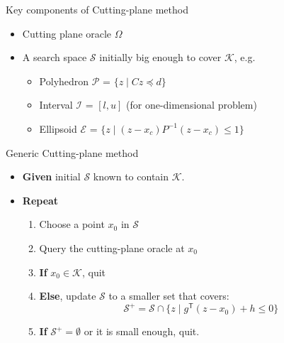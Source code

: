 \documentclass[10pt,ignorenonframetext,serif,onlymath]{beamer}
\providecommand{\tightlist}{%
  \setlength{\itemsep}{0pt}\setlength{\parskip}{0pt}}
\begin{document}
\begin{frame}{Key components of Cutting-plane method}
\protect\hypertarget{sec:key-components-of-cutting-plane-method}{}

\begin{itemize}
\tightlist
\item
  Cutting plane oracle \(\Omega\)
\item
  A search space \(\mathcal{S}\) initially big enough to cover
  \(\mathcal{K}\), e.g.

  \begin{itemize}
  \tightlist
  \item
    Polyhedron \(\mathcal{P}\) = \(\{z \mid C z \preceq d \}\)
  \item
    Interval \(\mathcal{I}\) = \([l, u]\) (for one-dimensional problem)
  \item
    Ellipsoid \(\mathcal{E}\) =
    \(\{z \mid (z-x_c)P^{-1}(z-x_c) \leq 1 \}\)
  \end{itemize}
\end{itemize}

\end{frame}

\begin{frame}{Generic Cutting-plane method}
\protect\hypertarget{sec:generic-cutting-plane-method}{}

\begin{itemize}
\tightlist
\item
  \textbf{Given} initial \(\mathcal{S}\) known to contain
  \(\mathcal{K}\).
\item
  \textbf{Repeat}

  \begin{enumerate}
  [1.]
  \tightlist
  \item
    Choose a point \(x_0\) in \(\mathcal{S}\)
  \item
    Query the cutting-plane oracle at \(x_0\)
  \item
    \textbf{If} \(x_0 \in \mathcal{K}\), quit
  \item
    \textbf{Else}, update \(\mathcal{S}\) to a smaller set that covers:
    \[\mathcal{S}^+ = \mathcal{S} \cap \{z \mid g^\mathsf{T} (z - x_0) + h \leq 0\}\]
  \item
    \textbf{If} \(\mathcal{S}^+ = \emptyset\) or it is small enough,
    quit.
  \end{enumerate}
\end{itemize}

\end{frame}
\end{document}
